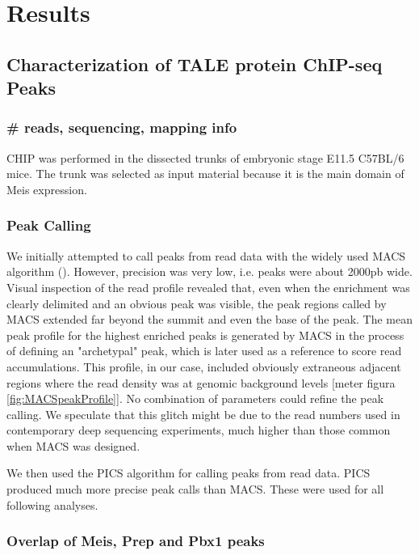  \chapter{Results}
\label{chp:results}

\section{Characterization of TALE protein ChIP-seq Peaks}

\subsection{\# reads, sequencing, mapping info}
\ac{CHIP} was performed in the dissected trunks of embryonic stage E11.5 C57BL/6 mice. The trunk was selected as input material because it is the main domain of Meis expression.

\subsection{Peak Calling}

We initially attempted to call peaks from read data with the widely used \ac{MACS} algorithm (\cite{MACS ref}). However, precision was very low, i.e. peaks were about 2000pb wide. Visual inspection of the read profile revealed that, even when the enrichment was clearly delimited and an obvious peak was visible, the peak regions called by \ac{MACS} extended far beyond the summit and even the base of the peak. The mean peak profile for the highest enriched peaks is generated by \ac{MACS} in the process of defining an "archetypal" peak, which is later used as a reference to score read accumulations. This profile, in our case, included obviously extraneous adjacent regions where the read density was at genomic background levels [meter figura \ref{fig:MACSpeakProfile}]. No combination of parameters could refine the peak calling. We speculate that this glitch might be due to the read numbers used in contemporary deep sequencing experiments, much higher than those common when \ac{MACS} was designed.

We then used the \ac{PICS} algorithm \cite{ref} for calling peaks from read data. \ac{PICS} produced much more precise peak calls than \ac{MACS}. These were used for all following analyses.

\subsection{Overlap of Meis, Prep and Pbx1 peaks}

